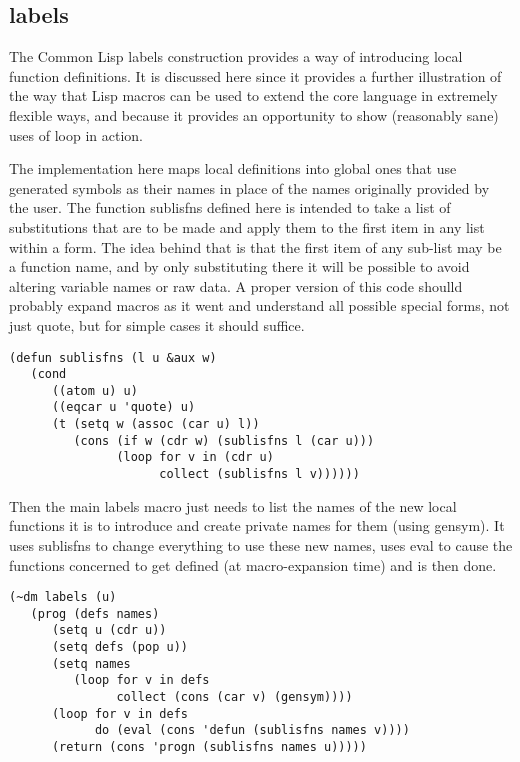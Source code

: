 \subsection{{\tx labels}}
The Common Lisp {\tx labels} construction provides a way of introducing
local function definitions. It is discussed here since it provides a further
illustration of the way that Lisp macros can be used to extend the core
language in extremely flexible ways, and because it provides an opportunity
to show (reasonably sane) uses of {\tx loop} in action.

The implementation here maps local definitions into global ones that
use generated symbols as their names in place of the names originally
provided by the user. The function {\tx sublisfns} defined here is intended
to take a list of substitutions that are to be made and apply them to the
first item in any list within a form. The idea behind that is that the first
item of any sub-list may be a function name, and by only substituting there
it will be possible to avoid altering variable names or raw data. A proper
version of this code shoulld probably expand macros as it went and understand
all possible special forms, not just {\tx quote}, but for simple cases it
should suffice.
{\small\begin{verbatim}
(defun sublisfns (l u &aux w)
   (cond
      ((atom u) u)
      ((eqcar u 'quote) u)
      (t (setq w (assoc (car u) l))
         (cons (if w (cdr w) (sublisfns l (car u)))
               (loop for v in (cdr u)
                     collect (sublisfns l v))))))
\end{verbatim}}
Then the main {\tx labels} macro just needs to list the names of the new
local functions it is to introduce and create private names for
them (using {\tx gensym}). It uses {\tx sublisfns} to change everything to
use these new names, uses {\tx eval} to cause the functions concerned to get
defined (at macro-expansion time) and is then done.
{\small\begin{verbatim}
(~dm labels (u)
   (prog (defs names)
      (setq u (cdr u))
      (setq defs (pop u))
      (setq names
         (loop for v in defs
               collect (cons (car v) (gensym))))
      (loop for v in defs
            do (eval (cons 'defun (sublisfns names v))))
      (return (cons 'progn (sublisfns names u)))))
\end{verbatim}}      


